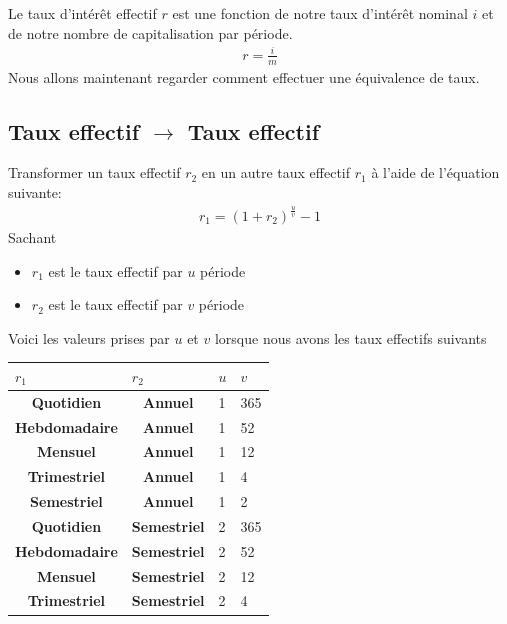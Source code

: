 \documentclass[letterpaper, 12pt]{article}
\newcommand{\1}{\mathds{1}}	%
\theoremstyle{definition}
\begin{document}
Le taux d'intérêt effectif $r$ est une fonction de notre taux d'intérêt nominal $i$ et de notre nombre de capitalisation par période. 
\begin{align*}
r=\frac{i}{m}
\end{align*}
Nous allons maintenant regarder comment effectuer une équivalence de taux. 


\subsection{Taux effectif $\rightarrow$ Taux effectif}

Transformer un taux effectif $r_2$ en un autre taux effectif $r_1$ à l'aide de l'équation suivante:
\begin{align*}
r_1 =(1+r_2)^{\frac{u}{v}}-1
\end{align*}
Sachant 
\begin{itemize}
\item $r_1$ est le taux effectif par $u$ période 
\item $r_2$ est le taux effectif par $v$ période 
\end{itemize}
Voici les valeurs prises par $u$ et $v$ lorsque nous avons les taux effectifs suivants 


\begin{table}[H]
\begin{center}
\begin{tabular}{|c|c|l|l|}
\hline
\multicolumn{1}{|l|}{\textbf{$r_1$}} & \multicolumn{1}{l|}{\textbf{$r_2$}} & \textbf{$u$} & \textbf{$v$} \\ \hline
\textbf{Quotidien}                   & \textbf{Annuel}                     & 1            & 365          \\ \hline
\textbf{Hebdomadaire}                & \textbf{Annuel}                     & 1            & 52           \\ \hline
\textbf{Mensuel}                     & \textbf{Annuel}                     & 1            & 12           \\ \hline
\textbf{Trimestriel}                 & \textbf{Annuel}                     & 1            & 4            \\ \hline
\textbf{Semestriel}                  & \textbf{Annuel}                     & 1            & 2            \\ \hline
\textbf{Quotidien}                   & \textbf{Semestriel}                 & 2            & 365          \\ \hline
\textbf{Hebdomadaire}                & \textbf{Semestriel}                 & 2            & 52           \\ \hline
\textbf{Mensuel}                     & \textbf{Semestriel}                 & 2            & 12           \\ \hline
\textbf{Trimestriel}                 & \textbf{Semestriel}                 & 2            & 4            \\ \hline
\end{tabular}
\end{center}
\end{table}
\end{document}
